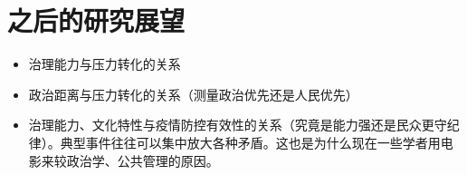 \documentclass[
  12pt,
]{ctexart}
\providecommand{\tightlist}{%
  \setlength{\itemsep}{0pt}\setlength{\parskip}{0pt}}
\begin{document}
\hypertarget{ux4e4bux540eux7684ux7814ux7a76ux5c55ux671b}{%
\section{之后的研究展望}\label{ux4e4bux540eux7684ux7814ux7a76ux5c55ux671b}}

\begin{itemize}
\tightlist
\item
  治理能力与压力转化的关系
\item
  政治距离与压力转化的关系（测量政治优先还是人民优先）
\item
  治理能力、文化特性与疫情防控有效性的关系（究竟是能力强还是民众更守纪律）。典型事件往往可以集中放大各种矛盾。这也是为什么现在一些学者用电影来较政治学、公共管理的原因。
\end{itemize}
\end{document}
